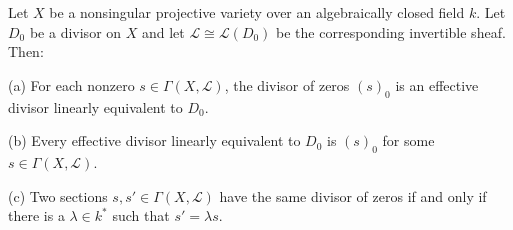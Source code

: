 Let $X$ be a nonsingular projective variety over an algebraically closed field $k$. Let $D_0$ be a divisor on $X$ and let $\mathcal{L} \cong \mathcal{L}(D_0)$ be the corresponding invertible sheaf. Then:

(a) For each nonzero $s \in \Gamma(X, \mathcal{L})$, the divisor of zeros $(s)_0$ is an effective divisor linearly equivalent to $D_0$.

(b) Every effective divisor linearly equivalent to $D_0$ is $(s)_0$ for some $s \in \Gamma(X, \mathcal{L})$.

(c) Two sections $s, s' \in \Gamma(X, \mathcal{L})$ have the same divisor of zeros if and only if there is a $\lambda \in k^*$ such that $s' = \lambda s$.
